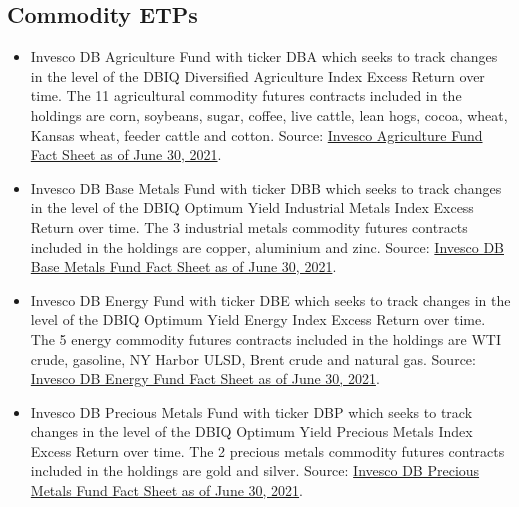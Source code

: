 \subsection*{Commodity ETPs}
    \begin{itemize}
        \item Invesco DB Agriculture Fund with ticker DBA which seeks to track changes in the level of the DBIQ Diversified Agriculture Index Excess Return over time. The 11 agricultural commodity futures contracts included in the holdings are corn, soybeans, sugar, coffee, live cattle, lean hogs, cocoa, wheat, Kansas wheat, feeder cattle and cotton. Source: \href{https://www.invesco.com/us-rest/contentdetail?contentId=f919e01e98630410VgnVCM10000046f1bf0aRCRD&dnsName=us}{Invesco Agriculture Fund Fact Sheet as of June 30, 2021}.%
        
        \item Invesco DB Base Metals Fund with ticker DBB which seeks to track changes in the level of the DBIQ Optimum Yield Industrial Metals Index Excess Return over time. The 3 industrial metals commodity futures contracts included in the holdings are copper, aluminium and zinc. Source: \href{https://www.invesco.com/us-rest/contentdetail?contentId=3919e01e98630410VgnVCM10000046f1bf0aRCRD&dnsName=us}{Invesco DB Base Metals Fund Fact Sheet as of June 30, 2021}.%
        
        \item Invesco DB Energy Fund with ticker DBE which seeks to track changes in the level of the DBIQ Optimum Yield Energy Index Excess Return over time. The 5 energy commodity futures contracts included in the holdings are WTI crude, gasoline, NY Harbor ULSD, Brent crude and natural gas. Source: \href{https://www.invesco.com/us-rest/contentdetail?contentId=7519e01e98630410VgnVCM10000046f1bf0aRCRD&dnsName=us}{Invesco DB Energy Fund Fact Sheet as of June 30, 2021}.%
        
        \item Invesco DB Precious Metals Fund with ticker DBP which seeks to track changes in the level of the DBIQ Optimum Yield Precious Metals Index Excess Return over time. The 2 precious metals commodity futures contracts included in the holdings are gold and silver. Source: \href{https://www.invesco.com/us-rest/contentdetail?contentId=f619e01e98630410VgnVCM10000046f1bf0aRCRD&dnsName=us}{Invesco DB Precious Metals Fund Fact Sheet as of June 30, 2021}.%
    \end{itemize}